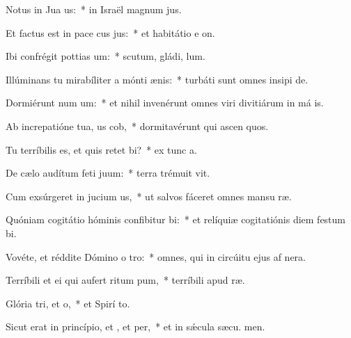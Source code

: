 \item Notus in Jua us:~* in Israël magnum  jus.
\item Et factus est in pace cus jus:~* et habitátio e  on.
\item Ibi confrégit pottias um:~* scutum, gládi,  lum.
\item Illúminans tu mirabíliter a mónti ænis:~* turbáti sunt omnes insipi de.
\item Dormiérunt num um:~* et nihil invenérunt omnes viri divitiárum in má is.
\item Ab increpatióne tua, us cob,~* dormitavérunt qui ascen quos.
\item Tu terríbilis es, et quis retet bi?~* ex tunc  a.
\item De cælo audítum feti juum:~* terra trémuit  vit.
\item Cum exsúrgeret in jucium us,~* ut salvos fáceret omnes mansu ræ.
\item Quóniam cogitátio hóminis confibitur bi:~* et relíquiæ cogitatiónis diem festum  bi.
\item Vovéte, et réddite Dómino o tro:~* omnes, qui in circúitu ejus af nera.
\item Terríbili et ei qui aufert ritum pum,~* terríbili apud  ræ.
\item Glória tri, et o,~* et Spirí to.
\item Sicut erat in princípio, et , et per,~* et in sǽcula sæcu. men.
